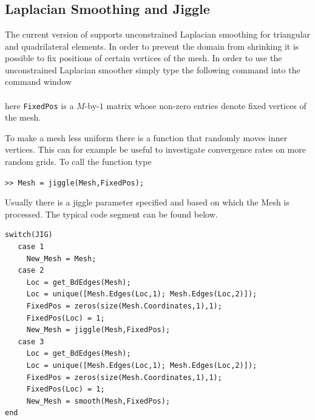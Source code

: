  \\
 \\
 \\

\subsection{Laplacian Smoothing and Jiggle}

 The current version of \LIBNAME supports unconstrained Laplacian smoothing for triangular and quadrilateral elements. In order to prevent the domain from shrinking it is possible to fix positions of certain vertices of the mesh. In order to use the unconstrained Laplacian smoother simply type the following command into the \MATLAB command window \\

 \\

\noindent here {\tt FixedPos} is a $M$-by-$1$ matrix whose non-zero entries denote fixed vertices of the mesh. 

To make a mesh less uniform there is a function that randomly moves inner vertices. This can for example be useful to investigate convergence rates on more random grids. To call the function type

\noindent \texttt{>> Mesh = jiggle(Mesh,FixedPos);}

\noindent Usually there is a jiggle parameter specified and based on which the Mesh is processed. The typical code segment can be found below.

\begin{lstlisting}
switch(JIG)
   case 1
     New_Mesh = Mesh;      
   case 2
     Loc = get_BdEdges(Mesh);
     Loc = unique([Mesh.Edges(Loc,1); Mesh.Edges(Loc,2)]);
     FixedPos = zeros(size(Mesh.Coordinates,1),1);
     FixedPos(Loc) = 1;
     New_Mesh = jiggle(Mesh,FixedPos);   
   case 3
     Loc = get_BdEdges(Mesh);
     Loc = unique([Mesh.Edges(Loc,1); Mesh.Edges(Loc,2)]);
     FixedPos = zeros(size(Mesh.Coordinates,1),1);
     FixedPos(Loc) = 1;
     New_Mesh = smooth(Mesh,FixedPos);
end
\end{lstlisting}



